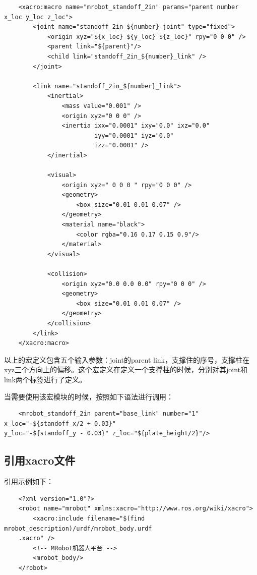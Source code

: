 \documentclass[10pt, oneside]{book}
\begin{document}
\begin{verbatim}
    <xacro:macro name="mrobot_standoff_2in" params="parent number x_loc y_loc z_loc">
        <joint name="standoff_2in_${number}_joint" type="fixed">
            <origin xyz="${x_loc} ${y_loc} ${z_loc}" rpy="0 0 0" />
            <parent link="${parent}"/>
            <child link="standoff_2in_${number}_link" />
        </joint>

        <link name="standoff_2in_${number}_link">
            <inertial>
                <mass value="0.001" />
                <origin xyz="0 0 0" />
                <inertia ixx="0.0001" ixy="0.0" ixz="0.0"
                         iyy="0.0001" iyz="0.0"
                         izz="0.0001" />
            </inertial>

            <visual>
                <origin xyz=" 0 0 0 " rpy="0 0 0" />
                <geometry>
                    <box size="0.01 0.01 0.07" />
                </geometry>
                <material name="black">
                    <color rgba="0.16 0.17 0.15 0.9"/>
                </material>
            </visual>

            <collision>
                <origin xyz="0.0 0.0 0.0" rpy="0 0 0" />
                <geometry>
                    <box size="0.01 0.01 0.07" />
                </geometry>
            </collision>
        </link>
    </xacro:macro>
\end{verbatim}

以上的宏定义包含五个输入参数：joint的parent link，支撑住的序号，支撑柱在xyz三个方向上的偏移。这个宏定义在定义一个支撑柱的时候，分别对其joint和link两个标签进行了定义。

当需要使用该宏模块的时候，按照如下语法进行调用：

\begin{verbatim}
    <mrobot_standoff_2in parent="base_link" number="1" x_loc="-${standoff_x/2 + 0.03}" 
y_loc="-${standoff_y - 0.03}" z_loc="${plate_height/2}"/>
\end{verbatim}


\subsection{引用xacro文件}

引用示例如下：

\begin{verbatim}
    <?xml version="1.0"?>
    <robot name="mrobot" xmlns:xacro="http://www.ros.org/wiki/xacro">
        <xacro:include filename="$(find mrobot_description)/urdf/mrobot_body.urdf
    .xacro" />
        <!-- MRobot机器人平台 -->
        <mrobot_body/>
    </robot>
\end{verbatim}
\end{document}
